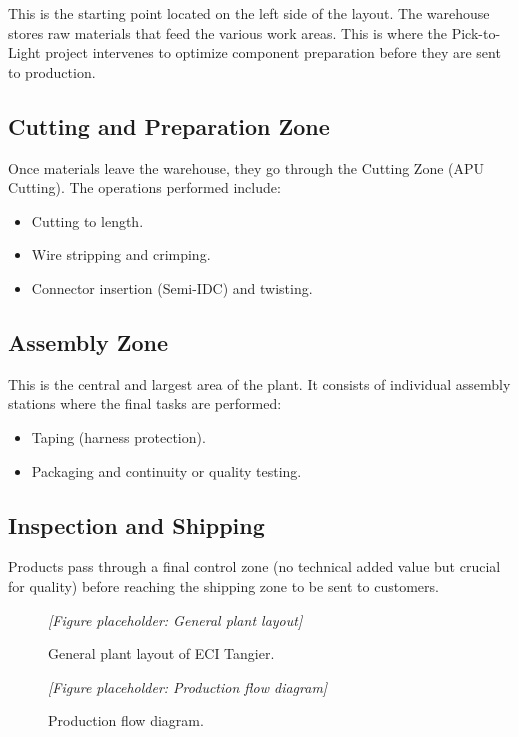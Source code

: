 This is the starting point located on the left side of the layout. The warehouse stores raw materials that feed the various work areas. This is where the Pick-to-Light project intervenes to optimize component preparation before they are sent to production.

\subsection{Cutting and Preparation Zone}

Once materials leave the warehouse, they go through the Cutting Zone (APU Cutting). The operations performed include:

\begin{itemize}
  \item Cutting to length.
  \item Wire stripping and crimping.
  \item Connector insertion (Semi-IDC) and twisting.
\end{itemize}

\subsection{Assembly Zone}

This is the central and largest area of the plant. It consists of individual assembly stations where the final tasks are performed:

\begin{itemize}
  \item Taping (harness protection).
  \item Packaging and continuity or quality testing.
\end{itemize}

\subsection{Inspection and Shipping}

Products pass through a final control zone (no technical added value but crucial for quality) before reaching the shipping zone to be sent to customers.

\begin{figure}[H]
  \centering
  \textit{[Figure placeholder: General plant layout]}
  \caption{General plant layout of ECI Tangier.}
  \label{fig:plant-layout}
\end{figure}

\begin{figure}[H]
  \centering
  \textit{[Figure placeholder: Production flow diagram]}
  \caption{Production flow diagram.}
  \label{fig:production-flow}
\end{figure}

